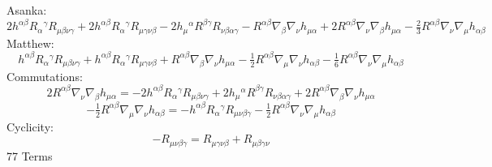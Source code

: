 \documentclass[10pt,letterpaper]{article}
\begin{document}
Asanka:
\begin{equation}
2h^{\alpha\beta}R_\alpha{}^\gamma R_{\mu\beta\nu\gamma} + 2h^{\alpha\beta}R_{\alpha}{}^\gamma R_{\mu\gamma\nu\beta} - 2h_{\mu}{}^\alpha R^{\beta\gamma} R_{\nu\beta\alpha\gamma} - R^{\alpha\beta}\nabla_\beta\nabla_\nu h_{\mu\alpha} + 2R^{\alpha\beta}\nabla_\nu\nabla_\beta h_{\mu\alpha} 
-\tfrac23 R^{\alpha\beta} \nabla_\nu \nabla_\mu h_{\alpha\beta}
\end{equation}
Matthew:
\begin{equation}
 h^{\alpha\beta}R_{\alpha}{}^\gamma R_{\mu\beta\nu\gamma} + h^{\alpha\beta} R_{\alpha}{}^\gamma R_{\mu\gamma\nu\beta}+R^{\alpha\beta}\nabla_\beta\nabla_\nu h_{\mu\alpha}-\tfrac12 R^{\alpha\beta}\nabla_\mu\nabla_\nu h_{\alpha\beta}-\tfrac16 R^{\alpha\beta}\nabla_\nu\nabla_\mu h_{\alpha\beta}
\end{equation}
Commutations:
\begin{equation}
2R^{\alpha\beta}\nabla_\nu\nabla_\beta h_{\mu\alpha} = -2 h^{\alpha\beta} R_{\alpha}{}^{\gamma} R_{\mu\beta\nu \gamma} + 2 h_{\mu}{}^{\alpha} R^{\beta \gamma} R_{\nu \beta\alpha\gamma} + 2 R^{\alpha \beta} \nabla_{\beta}\nabla_{\nu}h_{\mu \alpha}
\end{equation}
\begin{equation}
-\tfrac12 R^{\alpha\beta}\nabla_\mu\nabla_\nu h_{\alpha\beta} = - h^{\alpha \beta} R_{\alpha}{}^\gamma R_{\mu \nu\beta\gamma} -  \tfrac{1}{2} R^{\alpha \beta} \nabla_{\nu}\nabla_{\mu}h_{\alpha \beta}
\end{equation}
Cyclicity:
\begin{equation}
 -R_{\mu\nu\beta\gamma} = R_{\mu\gamma\nu\beta} + R_{\mu\beta\gamma\nu}
\end{equation}
77 Terms
\end{document}
